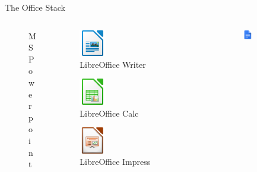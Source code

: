 \documentclass[10pt]{beamer}
\begin{document}
\begin{frame}{The Office Stack}
\begin{columns}[T]
\begin{column}{0.33\textwidth}
\begin{figure}
                    \caption{MS Powerpoint}
                \end{figure}
            \end{column}
            \vrule{}
            \begin{column}{0.33\textwidth}
                \begin{figure}
                    \centering
                    \includegraphics[width=0.25\textwidth]{images/libre-writer}
                    \caption{LibreOffice Writer}
                \end{figure}
                \begin{figure}
                    \centering
                    \includegraphics[width=0.25\textwidth]{images/libre-calc}
                    \caption{LibreOffice Calc}
                \end{figure}
                \begin{figure}
                    \centering
                    \includegraphics[width=0.25\textwidth]{images/libre-impress}
                    \caption{LibreOffice Impress}
                \end{figure}
            \end{column}
            \begin{column}{0.33\textwidth}
                \begin{figure}
                    \centering
                    \includegraphics[width=0.25\textwidth]{images/google-docs}

\end{figure}
\end{column}
\end{columns}
\end{frame}
\end{document}
